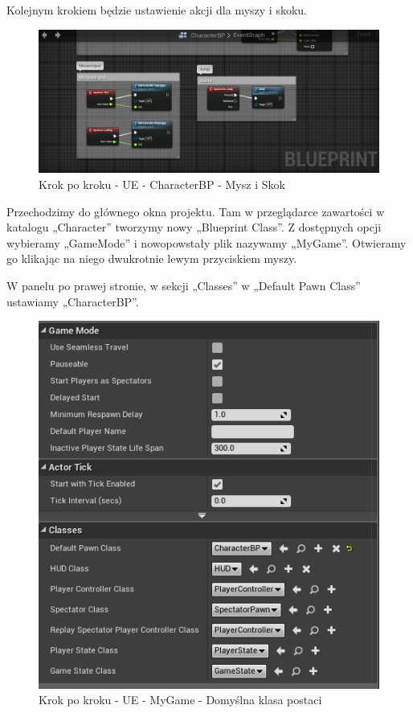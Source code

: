 \documentclass[12pt]{xmgr}
\begin{document}
Kolejnym krokiem będzie ustawienie akcji dla myszy i skoku.

\begin{figure}[!htb]
    \begin{center}
    \includegraphics[scale=0.35]{Screeny/UeKrokPoKroku/UE-CharacterBP-MouseAndJump.png}
    \end{center}
    \caption{Krok po kroku - UE -  CharacterBP - Mysz i Skok}
\end{figure}

\newpage
Przechodzimy do głównego okna projektu. Tam w przeglądarce zawartości w katalogu „Character” tworzymy nowy „Blueprint Class”. Z dostępnych opcji wybieramy „GameMode” i nowopowstały plik nazywamy „MyGame”. Otwieramy go klikając na niego dwukrotnie lewym przyciskiem myszy.

W panelu po prawej stronie, w sekcji „Classes” w „Default Pawn Class” ustawiamy „CharacterBP”.

\begin{figure}[!htb]
    \begin{center}
    \includegraphics[scale=0.35]{Screeny/UeKrokPoKroku/UE-MyGame-Class.png}
    \end{center}
    \caption{Krok po kroku - UE -  MyGame - Domyślna klasa postaci}
\end{figure}
\end{document}
